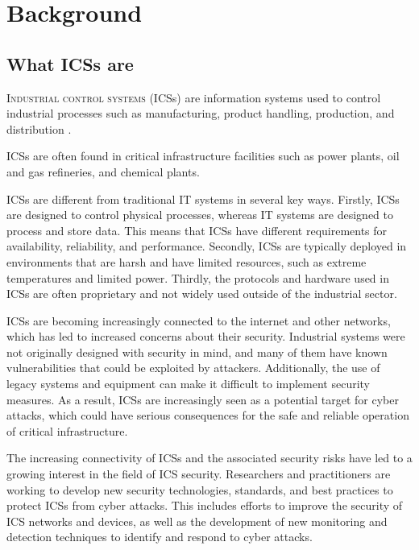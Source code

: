\chapter{Background}
\label{background}

\section{What ICSs are}
\label{sec:what_ics_are}
\lettrine[lines=2]{I}{ndustrial control systems} (ICSs) are information systems used to control industrial processes such as manufacturing, product handling, production, and distribution \cite{ics_definition}.

ICSs are often found in critical infrastructure facilities such as power plants, oil and gas refineries, and chemical plants.

\bigskip
ICSs are different from traditional IT systems in several key ways. Firstly, ICSs are designed to control physical processes, whereas IT systems are designed to process and store data. This means that ICSs have different requirements for availability, reliability, and performance. Secondly, ICSs are typically deployed in environments that are harsh and have limited resources, such as extreme temperatures and limited power. Thirdly, the protocols and hardware used in ICSs are often proprietary and not widely used outside of the industrial sector.

\bigskip
ICSs are becoming increasingly connected to the internet and other networks, which has led to increased concerns about their security. Industrial systems were not originally designed with security in mind, and many of them have known vulnerabilities that could be exploited by attackers. Additionally, the use of legacy systems and equipment can make it difficult to implement security measures. As a result, ICSs are increasingly seen as a potential target for cyber attacks, which could have serious consequences for the safe and reliable operation of critical infrastructure.

\bigskip
The increasing connectivity of ICSs and the associated security risks have led to a growing interest in the field of ICS security. Researchers and practitioners are working to develop new security technologies, standards, and best practices to protect ICSs from cyber attacks. This includes efforts to improve the security of ICS networks and devices, as well as the development of new monitoring and detection techniques to identify and respond to cyber attacks.

